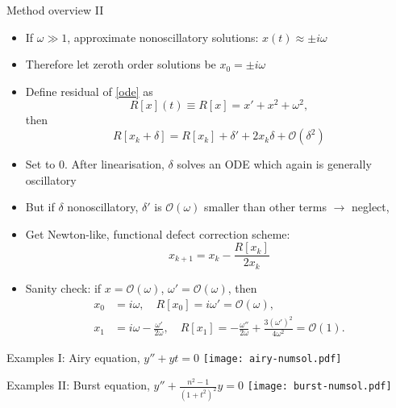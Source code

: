 \documentclass{beamer}
\numberwithin{equation}{theorem}
\begin{document}
\begin{noframe}
    Method overview II \medskip
    {\footnotesize
    \begin{itemize}
    \item{If $\omega \gg 1$, approximate nonoscillatory solutions: $x(t) \approx \pm i\omega $ } 
    \item{Therefore let zeroth order solutions be $x_0 = \pm i\omega$}
    \item{Define residual of \cref{ode} as
    \begin{equation}
    R[x](t) \equiv R[x] = x' + x^2 + \omega^2,
    \end{equation}
    then 
    \begin{equation}
    R[x_k + \delta] = R[x_k] + \delta' + 2x_k \delta + \mathcal{O}(\delta^2)
    \end{equation}
    }
    \item{Set to 0. After linearisation, $\delta$ solves an ODE which again is generally oscillatory}
    \item{But if $\delta$ nonoscillatory, $\delta'$ is $\mathcal{O}(\omega)$ smaller than other terms $\rightarrow$ neglect,}
    \item{Get Newton-like, functional defect correction scheme:
    \begin{equation}
    x_{k+1} = x_k - \frac{R[x_k]}{2x_k}
    \end{equation}
    }
    \item{Sanity check: if $x = \mathcal{O}(\omega)$, $\omega' = \mathcal{O}(\omega)$, then
    \begin{align}
    x_0 &= i\omega, \quad R[x_0] = i\omega' = \mathcal{O}(\omega),\\ 
    x_1 &= i\omega - \frac{\omega'}{2\omega}, \quad R[x_1] = -\frac{\omega''}{2\omega} + \frac{3(\omega')^2}{4\omega^2} = \mathcal{O}(1).
    \end{align}
    }
    \end{itemize}
    }
\end{noframe}

\begin{noframe}
	Examples I: Airy equation, $y'' + yt = 0$
	\texttt{[image: airy-numsol.pdf]}
\end{noframe}

\begin{noframe}%
	Examples II: Burst equation, $y'' + \frac{n^2 - 1}{(1 + t^2)^2}y = 0$
	\texttt{[image: burst-numsol.pdf]}
\end{noframe}
\end{document}

